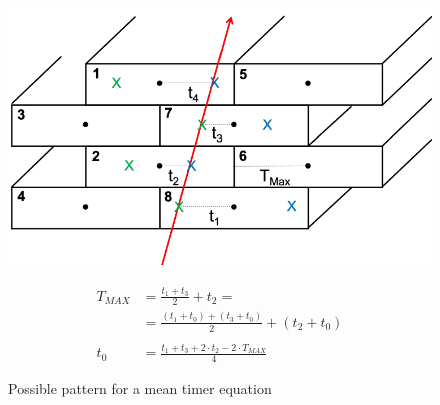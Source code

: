 \documentclass[a4paper,11pt]{book}
\begin{document}
\begin{figure}[hbtp]
\begin{minipage}[c]{0.5\textwidth}
\centering
\includegraphics[scale=0.5]{pictures/scheme_track_chamber.pdf}
\caption{Possible pattern for a mean timer equation}
\label{fig:alignment_pattern}
\end{minipage}  
\begin{minipage}[c]{0.5\textwidth}
\begin{align}
T_{MAX} & = \frac{t_1+t_3}{2} + t_2 = \nonumber \\
	        & = \frac{(t_1 + t_0) + (t_3 + t_0)}{2} + (t_2 + t_0) \nonumber \\
& \nonumber\\
t_0 &= \frac{t_1 + t_3 + 2\cdot t_2 - 2\cdot T_{MAX}}{4} \label{eq:t0_pattern}
\end{align}
\end{minipage}
\end{figure}
\end{document}

